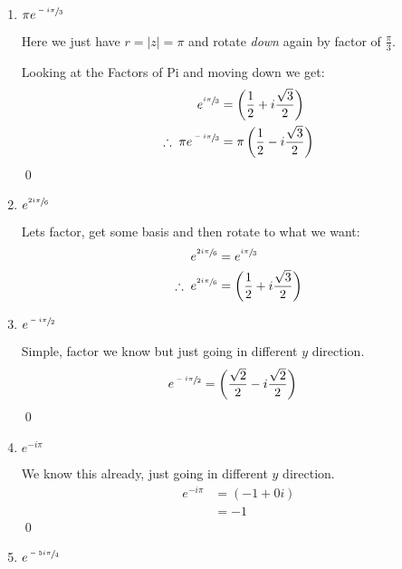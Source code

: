 \begin{enumerate}
\begin{enumerate}
		      \item $\pi e^{\sfrac{-i\pi}{3}}$

		            Here we just have $ r = |z| = \pi$ and rotate \textit{down} again by factor of $\frac{\pi}{3}.$

		            Looking at the Factors of Pi and moving down we get:
		            \begin{align*}
			            e^{\sfrac{i\pi}{3}}
			             & = \left( \frac{1}{2} + i\frac{\sqrt{3}}{2} \right)     \\
			            \therefore \; \pi e^{\sfrac{-i\pi}{3}}
			             & = \pi \left( \frac{1}{2} - i\frac{\sqrt{3}}{2} \right) \\
		            \end{align*}
		            \qed


		      \item $e^{\sfrac{2i\pi}{6}}$

		            Lets factor, get some basis and then rotate to what we want:
		            \begin{align*}
			            e^{\sfrac{2i\pi}{6}}               & = e^{\sfrac{i\pi}{3}}                              \\
			            \therefore \; e^{\sfrac{2i\pi}{6}} & = \left( \frac{1}{2} + i\frac{\sqrt{3}}{2} \right) \\
		            \end{align*}


		      \item $e^{\sfrac{-i\pi}{2}}$

		            Simple, factor we know but just going in different $y$ direction.
		            \begin{align*}
			            e^{\sfrac{-i\pi}{2}} & = \left( \frac{\sqrt{2}}{2} - i\frac{\sqrt{2}}{2} \right)
		            \end{align*}
		            \qed

		      \item $e^{-i\pi}$

		            We know this already, just going in different $y$ direction.
		            \begin{align*}
			            e^{-i\pi} & = \left( -1 + 0i \right) \\
			                      & = -1
		            \end{align*}
		            \qed

		      \item $e^{\sfrac{-5i\pi}{4}}$


\end{enumerate}
\end{enumerate}

